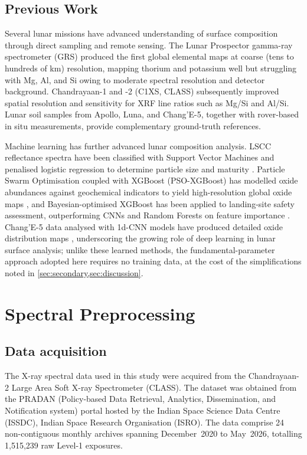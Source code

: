 \documentclass[journal,lettersize]{IEEEtran}
\begin{document}
\subsection{Previous Work}
Several lunar missions have advanced understanding of surface composition through direct sampling and remote sensing. The Lunar Prospector gamma-ray spectrometer (GRS) produced the first global elemental maps \cite{Lawrence1998} at coarse (tens to hundreds of km) resolution, mapping thorium and potassium well but struggling with Mg, Al, and Si owing to moderate spectral resolution and detector background. Chandrayaan-1 and -2 (C1XS, CLASS) subsequently improved spatial resolution and sensitivity for XRF line ratios such as Mg/Si and Al/Si. Lunar soil samples from Apollo, Luna, and Chang'E-5, together with rover-based in situ measurements, provide complementary ground-truth references.

Machine learning has further advanced lunar composition analysis. LSCC reflectance spectra have been classified with Support Vector Machines and penalised logistic regression to determine particle size and maturity \cite{Kodikara2020}. Particle Swarm Optimisation coupled with XGBoost (PSO-XGBoost) has modelled oxide abundances against geochemical indicators to yield high-resolution global oxide maps \cite{Wu2024}, and Bayesian-optimised XGBoost has been applied to landing-site safety assessment, outperforming CNNs and Random Forests on feature importance \cite{Wen2024}. Chang'E-5 data analysed with 1d-CNN models have produced detailed oxide distribution maps \cite{Yang2023}, underscoring the growing role of deep learning in lunar surface analysis; unlike these learned methods, the fundamental-parameter approach adopted here requires no training data, at the cost of the simplifications noted in \cref{sec:secondary,sec:discussion}.



\section{Spectral Preprocessing}\label{sec:preprocessing}

\subsection{Data acquisition}
The X-ray spectral data used in this study were acquired from the Chandrayaan-2 Large Area Soft X-ray Spectrometer (CLASS). The dataset was obtained from the PRADAN (Policy-based Data Retrieval, Analytics, Dissemination, and Notification system) portal hosted by the Indian Space Science Data Centre (ISSDC), Indian Space Research Organisation (ISRO). The data comprise 24 non-contiguous monthly archives spanning December~2020 to May~2026, totalling 1{,}515{,}239 raw Level-1 exposures.
\end{document}
